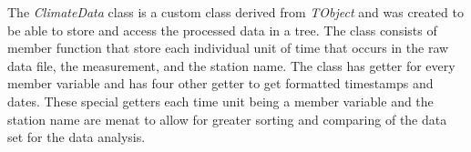 \documentclass[../main.tex]{subfiles}
\begin{document}
The \textit{ClimateData} class is a custom class derived from \textit{TObject} and was created to be able to store and access the processed data in a tree. The class consists of member function that store each individual unit of time that occurs in the raw data file, the measurement, and the station name. The class has getter for every member variable and has four other getter to get formatted timestamps and dates. These special getters each time unit being a member variable and the station name are menat to allow for greater sorting and comparing of the data set for the data analysis. 
\end{document}
